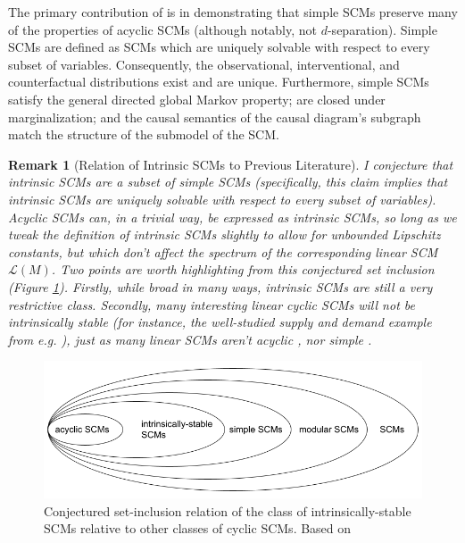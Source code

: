 \documentclass[letterpaper,10pt]{article}
\newtheorem{remark}{Remark}
\begin{document}
The primary contribution of \cite{Foundations} is in demonstrating that simple SCMs preserve many of the properties of acyclic SCMs (although notably, not $d$-separation). Simple SCMs are defined as SCMs which are uniquely solvable with respect to every subset of variables. Consequently, the observational, interventional, and counterfactual distributions exist and are unique. Furthermore, simple SCMs satisfy the general directed global Markov property; are closed under marginalization; and the causal semantics of the causal diagram's subgraph match the structure of the submodel of the SCM.

\begin{remark}[Relation of Intrinsic SCMs to Previous Literature]
I conjecture that intrinsic SCMs are a subset of simple SCMs (specifically, this claim implies that intrinsic SCMs are uniquely solvable with respect to every subset of variables). Acyclic SCMs can, in a trivial way, be expressed as intrinsic SCMs, so long as we tweak the definition of intrinsic SCMs slightly to allow for unbounded Lipschitz constants, but which don't affect the spectrum of the corresponding linear SCM $\mathcal{L}(M)$. Two points are worth highlighting from this conjectured set inclusion (Figure \ref{fig:set-inclusion}). Firstly, while broad in many ways, intrinsic SCMs are still a very restrictive class. Secondly, many interesting linear cyclic SCMs will not be intrinsically stable (for instance, the well-studied supply and demand example from e.g. \cite{SupplyDemand}), just as many linear SCMs aren't acyclic \cite{LearningLinear}, nor simple \cite{Foundations}.
\end{remark}

\begin{figure}
\centering
\includegraphics[width=.6\linewidth]{pics/my_own/set_inclusion.png}
\caption{Conjectured set-inclusion relation of the class of intrinsically-stable SCMs relative to other classes of cyclic SCMs. Based on \cite{Foundations}}
\label{fig:set-inclusion}
\end{figure}
\end{document}
